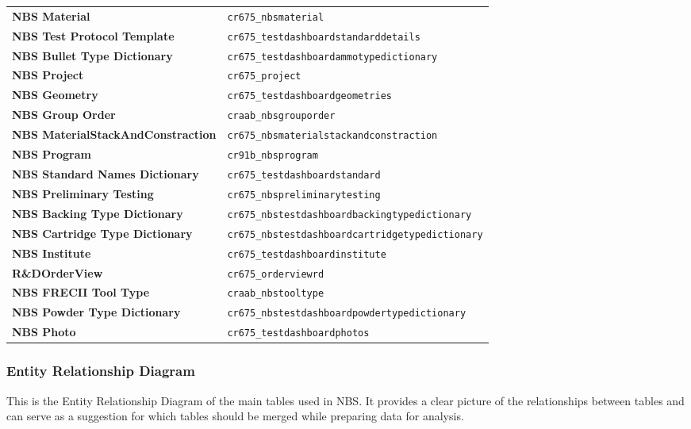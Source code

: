 \begin{footnotesize}
\begin{tabularx}{\textwidth}{l|l}
		\textbf{NBS Material} & \texttt{cr675\_nbsmaterial} \\[0.5em]
		\textbf{NBS Test Protocol Template} & \texttt{cr675\_testdashboardstandarddetails} \\[0.5em]
		\textbf{NBS Bullet Type Dictionary} & \texttt{cr675\_testdashboardammotypedictionary} \\[0.5em]
		\textbf{NBS Project} & \texttt{cr675\_project} \\[0.5em]
		\textbf{NBS Geometry} & \texttt{cr675\_testdashboardgeometries} \\[0.5em]
		\textbf{NBS Group Order} & \texttt{craab\_nbsgrouporder} \\[0.5em]
		\textbf{NBS MaterialStackAndConstraction} & \texttt{cr675\_nbsmaterialstackandconstraction} \\[0.5em]
		\textbf{NBS Program} & \texttt{cr91b\_nbsprogram} \\[0.5em]
		\textbf{NBS Standard Names Dictionary} & \texttt{cr675\_testdashboardstandard} \\[0.5em]
		\textbf{NBS Preliminary Testing} & \texttt{cr675\_nbspreliminarytesting} \\[0.5em]
		\textbf{NBS Backing Type Dictionary} & \texttt{cr675\_nbstestdashboardbackingtypedictionary} \\[0.5em]
		\textbf{NBS Cartridge Type Dictionary} & \texttt{cr675\_nbstestdashboardcartridgetypedictionary} \\[0.5em]
		\textbf{NBS Institute} & \texttt{cr675\_testdashboardinstitute} \\[0.5em]
		\textbf{R\&DOrderView} & \texttt{cr675\_orderviewrd} \\[0.5em]
		\textbf{NBS FRECII Tool Type} & \texttt{craab\_nbstooltype} \\[0.5em]
		\textbf{NBS Powder Type Dictionary} & \texttt{cr675\_nbstestdashboardpowdertypedictionary} \\[0.5em]
		\textbf{NBS Photo} & \texttt{cr675\_testdashboardphotos} \\[0.5em]
	\end{tabularx}
\end{footnotesize}

\subsubsection{Entity Relationship Diagram}

This is the Entity Relationship Diagram of the main tables used in NBS. It provides a clear picture of the relationships between tables and can serve as a suggestion for which tables should be merged while preparing data for analysis.

